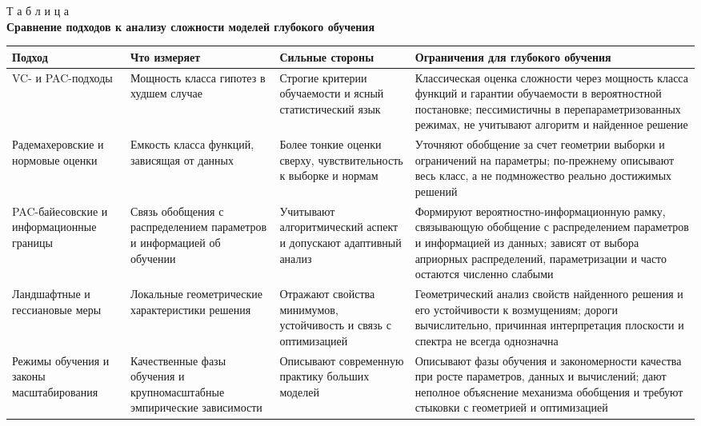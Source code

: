 \documentclass[russian]{intsys}
\begin{document}
\begin{table}[htbp]
\label{tab:comparison}
\begin{flushright}
{Т а б л и ц а \thetable}\\
\centering
\textbf{Сравнение подходов к анализу сложности моделей глубокого обучения}
\end{flushright}
\centering
\scriptsize
\setlength{\tabcolsep}{3pt}
\begin{tabular}{|>{\raggedright\arraybackslash}m{1.0in}|>{\raggedright\arraybackslash}m{1.15in}|>{\raggedright\arraybackslash}m{1.45in}|>{\raggedright\arraybackslash}m{1.65in}|}
\hline
Подход & Что измеряет & Сильные стороны & Ограничения для глубокого обучения \\
\hline
VC- и PAC-подходы & Мощность класса гипотез в худшем случае & Строгие критерии обучаемости и ясный статистический язык & Классическая оценка сложности через мощность класса функций и гарантии обучаемости в вероятностной постановке; пессимистичны в перепараметризованных режимах, не учитывают алгоритм и найденное решение \\
\hline
Радемахеровские и нормовые оценки & Емкость класса функций, зависящая от данных & Более тонкие оценки сверху, чувствительность к выборке и нормам & Уточняют обобщение за счет геометрии выборки и ограничений на параметры; по-прежнему описывают весь класс, а не подмножество реально достижимых решений \\
\hline
PAC-байесовские и информационные границы & Связь обобщения с распределением параметров и информацией об обучении & Учитывают алгоритмический аспект и допускают адаптивный анализ & Формируют вероятностно-информационную рамку, связывающую обобщение с распределением параметров и информацией из данных; зависят от выбора априорных распределений, параметризации и часто остаются численно слабыми \\
\hline
Ландшафтные и гессиановые меры & Локальные геометрические характеристики решения & Отражают свойства минимумов, устойчивость и связь с оптимизацией & Геометрический анализ свойств найденного решения и его устойчивости к возмущениям; дороги вычислительно, причинная интерпретация плоскости и спектра не всегда однозначна \\
\hline
Режимы обучения и законы масштабирования & Качественные фазы обучения и крупномасштабные эмпирические зависимости & Описывают современную практику больших моделей & Описывают фазы обучения и закономерности качества при росте параметров, данных и вычислений; дают неполное объяснение механизма обобщения и требуют стыковки с геометрией и оптимизацией \\
\hline
\end{tabular}
\end{table}
\end{document}
